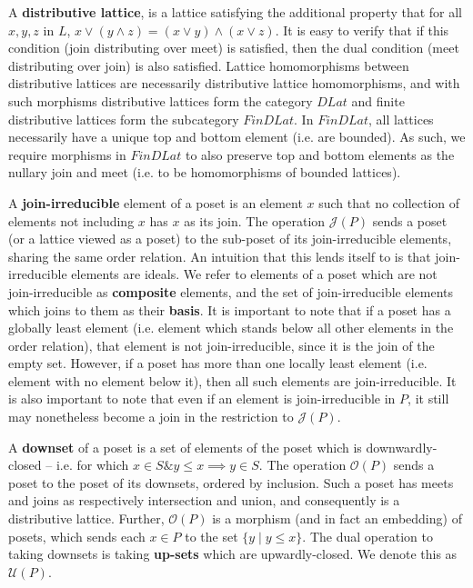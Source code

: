 \documentclass[hoptionsi,review,format=acmsmall]{acmart}
\theoremstyle{definition}
\newcommand{\Oc}{\mathcal{O}}
\newcommand{\Ucc}{\mathcal{U}}
\newcommand{\Jc}{\mathcal{J}}
\newcommand{\band}{\mathbin{\&}}
\begin{document}
A \textbf{distributive lattice}, is a lattice satisfying the additional property that for all \(x, y, z\) in \(L\), \(x \vee (y \wedge z) = (x \vee y) \wedge (x \vee z)\). It is easy to verify that if this condition (join distributing over meet) is satisfied, then the dual condition (meet distributing over join) is also satisfied.  Lattice homomorphisms between distributive lattices are necessarily distributive lattice homomorphisms, and with such morphisms distributive lattices form the category \(DLat\) and finite distributive lattices form the subcategory \(FinDLat\). In \(FinDLat\), all lattices necessarily have a unique top and bottom element (i.e. are bounded). As such, we require morphisms in \(FinDLat\) to also preserve top and bottom elements as the nullary join and meet (i.e. to be homomorphisms of bounded lattices).

A \textbf{join-irreducible} element of a poset is an element \(x\) such that no collection of elements not including \(x\) has \(x\) as its join. The operation \(\Jc(P)\) sends a poset (or a lattice viewed as a poset) to the sub-poset of its join-irreducible elements, sharing the same order relation. An intuition that this lends itself to is that join-irreducible elements are ideals. We refer to elements of a poset which are not join-irreducible as \textbf{composite} elements, and the set of join-irreducible elements which joins to them as their \textbf{basis}. It is important to note that if a poset has a globally least element (i.e. element which stands below all other elements in the order relation), that element is not join-irreducible, since it is the join of the empty set. However, if a poset has more than one locally least element (i.e. element with no element below it), then all such elements are join-irreducible. It is also important to note that even if an element is join-irreducible in \(P\), it still may nonetheless become a join in the restriction to \(\Jc(P)\).

A \textbf{downset} of a poset is a set of elements of the poset which is downwardly-closed -- i.e. for which \(x \in S \band y \le x \implies y \in S\). The operation \(\Oc(P)\) sends a poset to the poset of its downsets, ordered by inclusion. Such a poset has meets and joins as respectively intersection and union, and consequently is a distributive lattice. Further, \(\Oc(P)\) is a morphism (and in fact an embedding) of posets, which sends each \(x \in P\) to the set \(\{y \mathbin{|} y \le x\}\). The dual operation to taking downsets is taking \textbf{up-sets}  which are upwardly-closed. We denote this as \(\Ucc(P)\).
\end{document}
